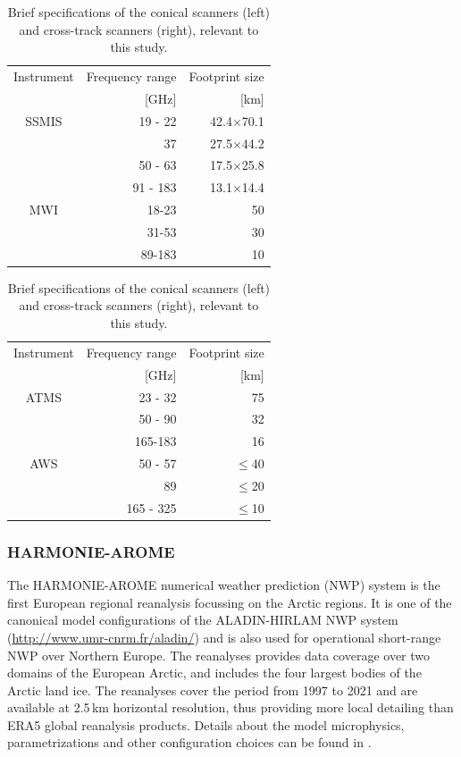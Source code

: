 \documentclass[12pt,oneside,a4paper]{article}
\begin{document}
\begin{table}[!t]
	\footnotesize
	\centering
	\caption{Brief specifications of the conical scanners (left) and cross-track scanners (right), relevant to this study.}
	\label{tab:specifications_instruments}	
	\parbox{.45\linewidth}{
	\centering
	\begin{tabular}{crr}
	\toprule
		Instrument & Frequency range 	& Footprint size \\
					& [GHz]             & [km]       \\
		\midrule			
		SSMIS	   &19 - 22		& 42.4$\times$70.1	\\
				   &37          &27.5$\times$44.2  \\
				   &50 - 63       & 17.5$\times$25.8 \\
				   &91 - 183    &  13.1$\times$14.4\\
		\midrule
		MWI 	   &18-23 		&50\\
				   &31-53 		& 30\\
				   & 89-183 	& 10\\	
		\bottomrule		
	\end{tabular}
	}
\hfill
\parbox{.45\linewidth}{
	\centering
	\begin{tabular}{crr}
	\toprule
	Instrument & Frequency range 	& Footprint size \\
	& [GHz]             & [km]       \\
	\midrule			
	ATMS	    &23 - 32		& 75	\\
				&50 - 90        &32  \\
				&165-183        & 16 \\
	\midrule
	AWS 	   &50 - 57 		& $\le$40\\
			   &89 				& $\le$20\\
			   & 165 - 325 		& $\le$10\\	
	\bottomrule		
\end{tabular}
}
\end{table}



\subsubsection{HARMONIE-AROME}
%
\label{sec:harmonie}
The HARMONIE-AROME numerical weather prediction (NWP) system is the first
European regional reanalysis focussing on the Arctic regions. It is one of the canonical model configurations of the ALADIN-HIRLAM
NWP system (\url{http://www.umr-cnrm.fr/aladin/}) and is also used for operational short-range NWP over Northern Europe. The reanalyses provides data coverage over two domains of the European Arctic, and includes the four largest bodies of the Arctic land ice. The reanalyses cover the period from 1997 to 2021 and are available at 2.5\,km
horizontal resolution, thus providing more local detailing than ERA5 global reanalysis products. Details about the model microphysics, parametrizations and other configuration choices can be found in \citet{bengtsson:2017:harmo}.
 
\end{document}
